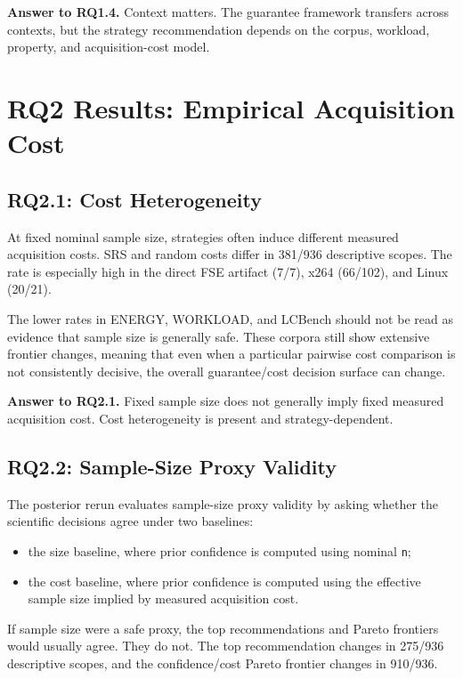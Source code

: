\documentclass[smallcondensed]{svjour3}
\providecommand{\tightlist}{%
  \setlength{\itemsep}{0pt}\setlength{\parskip}{0pt}}
\begin{document}
\textbf{Answer to RQ1.4.} Context matters. The guarantee framework
transfers across contexts, but the strategy recommendation depends on
the corpus, workload, property, and acquisition-cost model.

\section{RQ2 Results: Empirical Acquisition
Cost}\label{rq2-results-empirical-acquisition-cost}

\subsection{RQ2.1: Cost Heterogeneity}\label{rq2.1-cost-heterogeneity}

At fixed nominal sample size, strategies often induce different measured
acquisition costs. SRS and random costs differ in 381/936 descriptive
scopes. The rate is especially high in the direct FSE artifact (7/7),
x264 (66/102), and Linux (20/21).

The lower rates in ENERGY, WORKLOAD, and LCBench should not be read as
evidence that sample size is generally safe. These corpora still show
extensive frontier changes, meaning that even when a particular pairwise
cost comparison is not consistently decisive, the overall guarantee/cost
decision surface can change.

\textbf{Answer to RQ2.1.} Fixed sample size does not generally imply
fixed measured acquisition cost. Cost heterogeneity is present and
strategy-dependent.

\subsection{RQ2.2: Sample-Size Proxy
Validity}\label{rq2.2-sample-size-proxy-validity}

The posterior rerun evaluates sample-size proxy validity by asking
whether the scientific decisions agree under two baselines:

\begin{itemize}
\tightlist
\item
  the size baseline, where prior confidence is computed using nominal
  \texttt{n};
\item
  the cost baseline, where prior confidence is computed using the
  effective sample size implied by measured acquisition cost.
\end{itemize}

If sample size were a safe proxy, the top recommendations and Pareto
frontiers would usually agree. They do not. The top recommendation
changes in 275/936 descriptive scopes, and the confidence/cost Pareto
frontier changes in 910/936.
\end{document}
